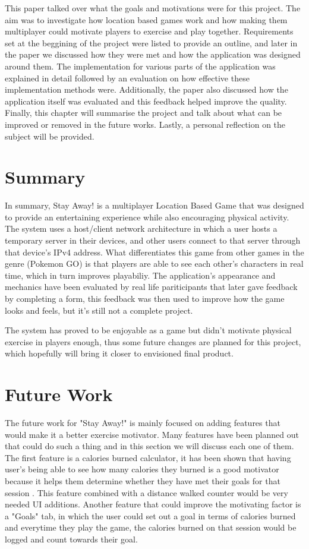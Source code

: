 \documentclass{dissertation}
\begin{document}
This paper talked over what the goals and motivations were for this project. The aim was to investigate how location based games work and how making them multiplayer could motivate players to exercise and play together. Requirements set at the beggining of the project were listed to provide an outline, and later in the paper we discussed how they were met and how the application was designed around them. The implementation for various parts of the application was explained in detail followed by an evaluation on how effective these implementation methods were. Additionally, the paper also discussed how the application itself was evaluated and this feedback helped improve the quality. Finally, this chapter will summarise the project and talk about what can be improved or removed in the future works. Lastly, a personal reflection on the subject will be provided.

\section{Summary}

In summary, Stay Away! is a multiplayer Location Based Game that was designed to provide an entertaining experience while also encouraging physical activity. The system uses a host/client network architecture in which a user hosts a temporary server in their devices, and other users connect to that server through that device's IPv4 address. What differentiates this game from other games in the genre (Pokemon GO) is that players are able to see each other's characters in real time, which in turn improves playabiliy. The application's appearance and mechanics have been evaluated by real life pariticipants that later gave feedback by completing a form, this feedback was then used to improve how the game looks and feels, but it's still not a complete project.

The system has proved to be enjoyable as a game but didn't motivate physical exercise in players enough, thus some future changes are planned for this project, which hopefully will bring it closer to envisioned final product.

\section{Future Work}

The future work for "Stay Away!" is mainly focused on adding features that would make it a better exercise motivator. Many features have been planned out that could do such a thing and in this section we will discuss each one of them. The first feature is a calories burned calculator, it has been shown that having user's being able to see how many calories they burned is a good motivator because it helps them determine whether they have met their goals for that session \citep{Sullivan16}. This feature combined with a distance walked counter would be very needed UI additions. Another feature that could improve the motivating factor is a "Goals" tab, in which the user could set out a goal in terms of calories burned and everytime they play the game, the calories burned on that session would be logged and count towards their goal. 
\end{document}
